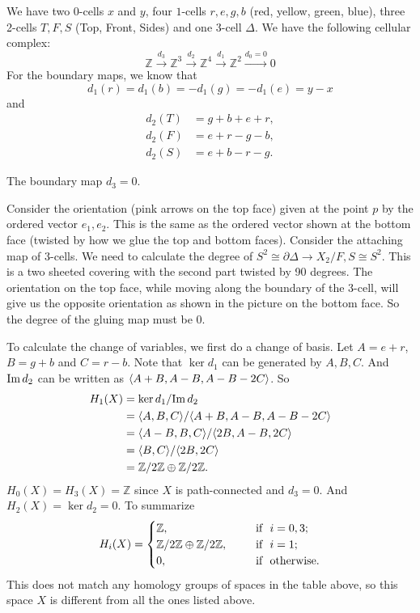 \documentclass[a4paper, 12pt]{article}
\begin{document}
\begin{solution}
\begin{enumerate}[(a)]
We have two 0-cells \(x\) and \(y\), four \(1\)-cells \(r,e,g,b\) (red, yellow, green, blue), three 2-cells \(T,F,S\) (Top, Front, Sides) and one 3-cell \(\Delta\). We have the following cellular complex: 
\[\mathbb{Z}\xrightarrow{d_3}\mathbb{Z}^3\xrightarrow{d_2}\mathbb{Z}^4\xrightarrow{ d_1}\mathbb{Z}^2\xrightarrow{d_0=0}0\]
For the boundary maps, we know that 
\[d_1(r)=d_1(b)=-d_1(g)=-d_1(e)=y-x\]
and 
\begin{align*}
	d_2(T)&=g+b+e+r,\\ 
	d_2(F)&=e+r-g-b,\\ 
	d_2(S)&=e+b-r-g.
\end{align*}
\begin{claim}
The boundary map \(d_3=0\).
\end{claim}
\begin{claimproof}
Consider the orientation (pink arrows on the top face) given at the point \(p\) by the ordered vector \(e_1,e_2\). This is the same as the ordered vector shown at the bottom face (twisted by how we glue the top and bottom faces). Consider the attaching 
map of 3-cells. We need to calculate the degree of \(S^2\cong\partial \Delta\rightarrow X_2/F,S\cong S^2 \). This is a two sheeted covering with the second part twisted by 90 degrees. The orientation on the top face, while moving along the boundary of the 3-cell, will give 
us the opposite orientation as shown in the picture on the bottom face. So the degree of the gluing map must be 0.
\end{claimproof}

To calculate the change of variables, we first do a change of basis. Let \(A=e+r\), \(B=g+b\) and \(C=r-b\). Note that \(\ker d_1\) can be generated by \(A,B,C\). And \(\text{Im}\, d_2\) can be written as 
\(\langle A+B,A-B,A-B-2C \rangle\). So 
\begin{align*}
	H_1(X)&=\ker d_1/\text{Im}\, d_2\\ 
	      &=\langle A,B,C\rangle/\langle A+B,A-B,A-B-2C\rangle\\ 
	      &=\langle A-B,B,C\rangle/\langle 2B, A-B, 2C\rangle\\ 
		  &=\langle B,C\rangle/\langle 2B,2C\rangle\\ 
		  &=\mathbb{Z}/2 \mathbb{Z}\oplus \mathbb{Z}/2 \mathbb{Z}.
\end{align*}
\(H_0(X)=H_3(X)=\mathbb{Z}\) since \(X\) is path-connected and \(d_3=0\). And 
\(H_2(X)=\ker d_2=0\). To summarize 
\[H_i(X)=\begin{cases}
	\mathbb{Z},&\ \ \ \iif i=0,3;\\ 
	\mathbb{Z}/2 \mathbb{Z}\oplus \mathbb{Z}/2 \mathbb{Z},&\ \ \ \iif i=1;\\ 
	0,&\ \ \ \iif \text{otherwise}.
\end{cases}\] 
This does not match any homology groups of spaces in the table above, so this space \(X\) is different from all the ones listed above. 
\end{enumerate}
\end{solution}
\end{document}
